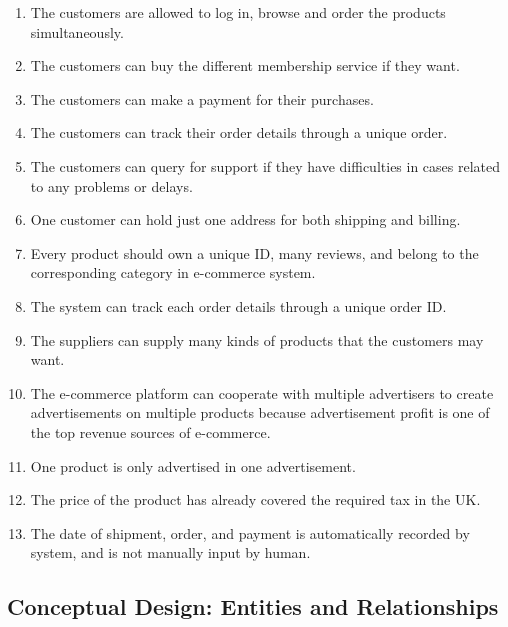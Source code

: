 \documentclass[
  letterpaper,
  DIV=11,
  numbers=noendperiod]{scrartcl}
\begin{document}
\begin{enumerate}
\def\labelenumi{\arabic{enumi}.}
\item
  The customers are allowed to log in, browse and order the products
  simultaneously.
\item
  The customers can buy the different membership service if they want.
\item
  The customers can make a payment for their purchases.
\item
  The customers can track their order details through a unique order.
\item
  The customers can query for support if they have difficulties in cases
  related to any problems or delays.
\item
  One customer can hold just one address for both shipping and billing.
\item
  Every product should own a unique ID, many reviews, and belong to the
  corresponding category in e-commerce system.
\item
  The system can track each order details through a unique order ID.
\item
  The suppliers can supply many kinds of products that the customers may
  want.
\item
  The e-commerce platform can cooperate with multiple advertisers to
  create advertisements on multiple products because advertisement
  profit is one of the top revenue sources of e-commerce.
\item
  One product is only advertised in one advertisement.
\item
  The price of the product has already covered the required tax in the
  UK.
\item
  The date of shipment, order, and payment is automatically recorded by
  system, and is not manually input by human.
\end{enumerate}

\hypertarget{conceptual-design-entities-and-relationships}{%
\subsection{Conceptual Design: Entities and
Relationships}\label{conceptual-design-entities-and-relationships}}
\end{document}
